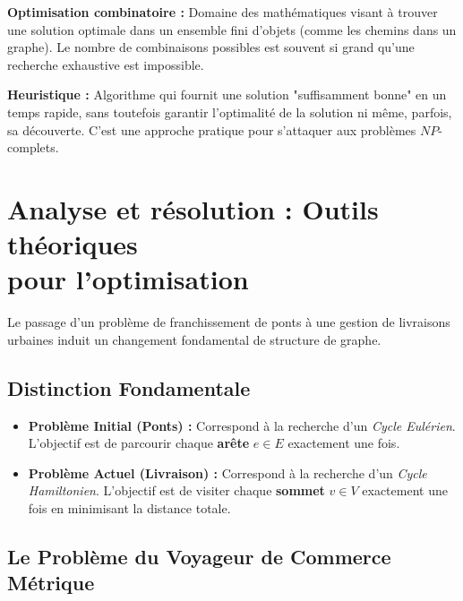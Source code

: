 \vspace{0.5cm}

\noindent \textbf{Optimisation combinatoire :} Domaine des mathématiques visant à trouver une solution optimale dans un ensemble fini d'objets (comme les chemins dans un graphe). Le nombre de combinaisons possibles est souvent si grand qu'une recherche exhaustive est impossible.

\vspace{0.5cm}

\noindent \textbf{Heuristique :} Algorithme qui fournit une solution "suffisamment bonne" en un temps rapide, sans toutefois garantir l'optimalité de la solution ni même, parfois, sa découverte. C'est une approche pratique pour s'attaquer aux problèmes $NP$-complets.

\newpage

\section*{Analyse et résolution : Outils théoriques \\ pour l'optimisation}

\noindent Le passage d'un problème de franchissement de ponts à une gestion de livraisons urbaines induit un changement fondamental de structure de graphe.

\subsection*{Distinction Fondamentale}
{}

\noindent \begin{itemize}
    \item \textbf{Problème Initial (Ponts) :} Correspond à la recherche d'un \textit{Cycle Eulérien}. L'objectif est de parcourir chaque \textbf{arête} $e \in E$ exactement une fois.
    \item \textbf{Problème Actuel (Livraison) :} Correspond à la recherche d'un \textit{Cycle Hamiltonien}. L'objectif est de visiter chaque \textbf{sommet} $v \in V$ exactement une fois en minimisant la distance totale.
\end{itemize}

\subsection*{Le Problème du Voyageur de Commerce Métrique}
{}

